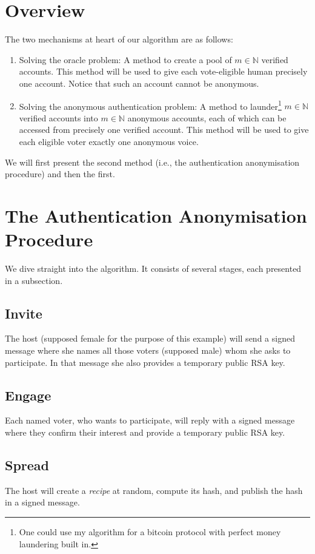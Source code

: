 \documentclass{article}
\newcommand{\N}{\mathbb{N}\xspace}
\theoremstyle{definition}
\begin{document}
	\section{Overview}
	The two mechanisms at heart of our algorithm are as follows:
	\begin{enumerate}
		\item Solving the oracle problem: A method to create a pool of $m \in \N$ verified accounts. This method will be used to give each vote-eligible human precisely one account. Notice that such an account cannot be anonymous.
		\item Solving the anonymous authentication problem: A method to launder\footnote{One could use my algorithm for a bitcoin protocol with perfect money laundering built in.} $m \in \N$ verified accounts into $m \in \N$ anonymous accounts, each of which can be accessed from precisely one verified account. This method will be used to give each eligible voter exactly one anonymous voice.
	\end{enumerate}
	
	We will first present the second method (i.e., the authentication anonymisation procedure) and then the first.
	
	\section{The Authentication Anonymisation Procedure}
	We dive straight into the algorithm. It consists of several stages, each presented in a subsection.
	
	\subsection{Invite}
	The host (supposed female for the purpose of this example) will send a signed message where she names all those voters (supposed male) whom she asks to participate. In that message she also provides a temporary public RSA key.
	
	\subsection{Engage}
	Each named voter, who wants to participate, will reply with a signed message where they confirm their interest and provide a temporary public RSA key.
	
	\subsection{Spread}
	The host will create a \emph{recipe} at random, compute its hash, and publish the hash in a signed message.
	
\end{document}
